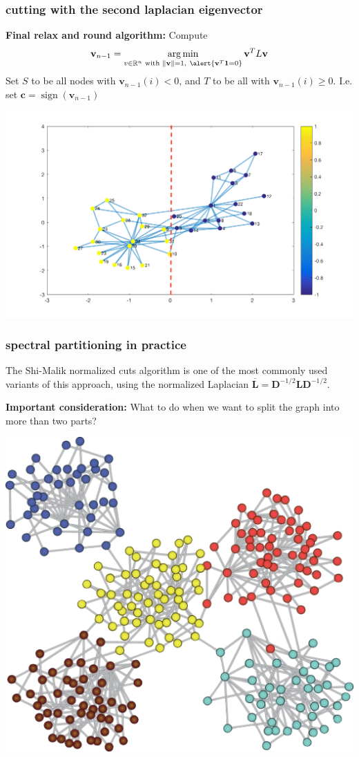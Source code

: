 \documentclass[compress]{beamer}
\newcommand{\bv}[1]{\mathbf{#1}}
\newcommand{\R}{\mathbb{R}}
\DeclareMathOperator*{\argmin}{arg\,min}
\DeclareMathOperator{\sign}{sign}
\newcommand{\norm}[1]{\|#1\|}
\begin{document}
\begin{frame}
	\frametitle{cutting with the  second laplacian eigenvector}
	\textbf{Final relax and round algorithm:} Compute 
	$$\bv{v}_{n-1} = \argmin_{v \in \R^n \text{ with } \norm{\bv{v}} = 1,\ \alert{\bv{v}^T \bv{1} = 0}} \bv{v}^T L \bv{v}$$ Set $S$ to be all nodes with $\bv{v}_{n-1}(i) < 0$, and $T$ to be all with $\bv{v}_{n-1}(i) \ge 0$. I.e. set $\bv{c} = \sign(\bv{v}_{n-1})$
	\begin{center}
		\vspace{-1em}
		\includegraphics[width=.9\textwidth]{cut2-fix.png}
	\end{center}
\end{frame}

\begin{frame}
	\frametitle{spectral partitioning in practice}
	The Shi-Malik normalized cuts algorithm is one of the most commonly used variants of this approach, using the normalized Laplacian $\mathbf{\overline L} = \bv{D}^{-1/2} \bv{L} \bv{D}^{-1/2}$.
	
		\textbf{Important consideration:} What to do when we want to split the graph into more than two parts?
		\begin{center}
				\includegraphics[width=.33\textwidth]{multiway.png}
		\end{center}
\end{frame}
\end{document}
